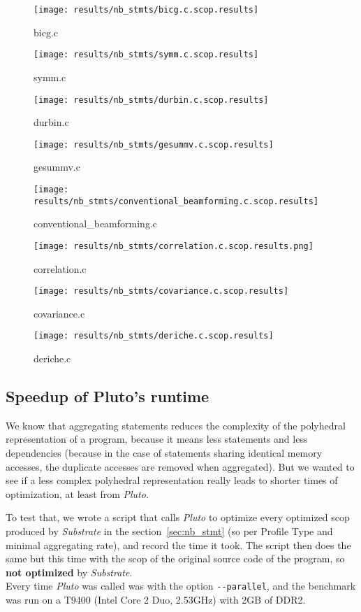 \documentclass[paper=a4, fontsize=11.5pt]{scrartcl}
\numberwithin{equation}{section}        %
\numberwithin{figure}{section}          %
\numberwithin{table}{section}               %
\begin{document}
\begin{figure}[H]
    \center
    \texttt{[image: results/nb\_stmts/bicg.c.scop.results]}
    \caption{bicg.c}\label{fig:nb_stmts:bicg}
    \texttt{[image: results/nb\_stmts/symm.c.scop.results]}
    \caption{symm.c}\label{fig:nb_stmts:symm}
\end{figure}
\begin{figure}[H]
    \center
    \texttt{[image: results/nb\_stmts/durbin.c.scop.results]}
    \caption{durbin.c}\label{fig:nb_stmts:durbin}
    \texttt{[image: results/nb\_stmts/gesummv.c.scop.results]}
    \caption{gesummv.c}\label{fig:nb_stmts:gesummv}
\end{figure}
\begin{figure}[H]
    \center
    \texttt{[image: results/nb\_stmts/conventional\_beamforming.c.scop.results]}
    \caption{conventional\_beamforming.c}\label{fig:nb_stmts:conv_beam}
    \texttt{[image: results/nb\_stmts/correlation.c.scop.results.png]}
    \caption{correlation.c}\label{fig:nb_stmts:correlation}
\end{figure}
\begin{figure}[H]
    \center
    \texttt{[image: results/nb\_stmts/covariance.c.scop.results]}
    \caption{covariance.c}\label{fig:nb_stmts:covariance}
    \texttt{[image: results/nb\_stmts/deriche.c.scop.results]}
    \caption{deriche.c}\label{fig:nb_stmts:deriche}
\end{figure}
\restoregeometry

\subsection{Speedup of Pluto's runtime}
\label{sec:speedup_pluto}

We know that aggregating statements reduces the complexity of the polyhedral representation
of a program, because it means less statements and less dependencies (because in the case
of statements sharing identical memory accesses, the duplicate accesses are removed when aggregated).
But we wanted to see if a less complex polyhedral representation really leads to shorter
times of optimization, at least from \textit{Pluto}.

\bigskip

To test that, we wrote a script that calls \textit{Pluto} to optimize every optimized scop produced
by \textit{Substrate} in the section~\ref{sec:nb_stmt} (so per Profile Type and minimal aggregating rate),
and record the time it took. The script then does the same but this time with the scop of
the original source code of the program, so \textbf{not optimized} by \textit{Substrate}.\\
Every time \textit{Pluto} was called was with the option \verb'--parallel', and the benchmark
was run on a T9400 (Intel Core 2 Duo, 2.53GHz) with 2GB of DDR2.
\end{document}
